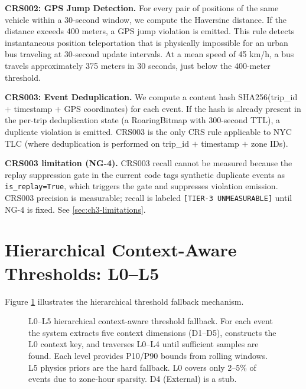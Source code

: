 \textbf{CRS002: GPS Jump Detection.} For every pair of positions of the
same vehicle within a 30-second window, we compute the Haversine distance.
If the distance exceeds 400 meters, a GPS jump violation is emitted.
This rule detects instantaneous position teleportation that is physically
impossible for an urban bus traveling at 30-second update intervals.
At a mean speed of 45 km/h, a bus travels approximately 375 meters in
30 seconds, just below the 400-meter threshold.

\textbf{CRS003: Event Deduplication.} We compute a content hash
SHA256(trip\_id $+$ timestamp $+$ GPS coordinates) for each event.
If the hash is already present in the per-trip deduplication state (a
RoaringBitmap with 300-second TTL), a duplicate violation is emitted.
CRS003 is the only CRS rule applicable to NYC TLC (where deduplication
is performed on trip\_id $+$ timestamp $+$ zone IDs).

\textbf{CRS003 limitation (NG-4).} CRS003 recall cannot be measured
because the replay suppression gate in the current code tags synthetic
duplicate events as \texttt{is\_replay=True}, which triggers the gate
and suppresses violation emission. CRS003 precision is measurable;
recall is labeled \texttt{[TIER-3\ UNMEASURABLE]} until NG-4 is fixed.
See \ref{sec:ch3-limitations}.

\section{Hierarchical Context-Aware Thresholds: L0--L5}
\label{sec:threshold-hierarchy}

Figure \ref{fig:l05-hierarchy} illustrates the hierarchical threshold
fallback mechanism.

\begin{figure}[htbp]
  \centering
  \caption{L0--L5 hierarchical context-aware threshold fallback. For each event
    the system extracts five context dimensions (D1--D5), constructs the L0
    context key, and traverses L0--L4 until sufficient samples are found.
    Each level provides P10/P90 bounds from rolling windows. L5 physics priors
    are the hard fallback. L0 covers only 2--5\% of events due to zone-hour
    sparsity. D4 (External) is a stub.}
  \label{fig:l05-hierarchy}
\end{figure}

